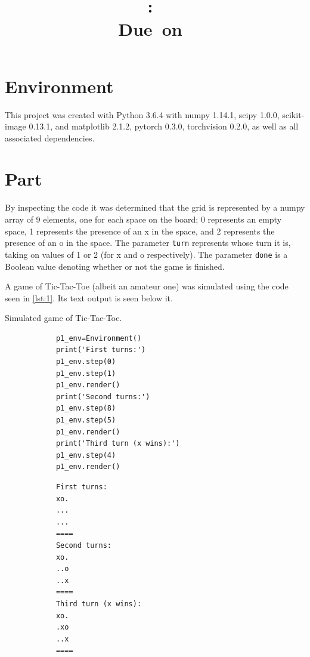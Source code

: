 \documentclass{article}
\title{
	\vspace{2in}
	\textmd{\textbf{\hmwkClass:\ \hmwkTitle}}\\
	\normalsize\vspace{0.1in}\small{Due\ on\ \hmwkDueDate}\\
	\vspace{0.1in}
	\vspace{3in}
}
\author{\textbf{\hmwkAuthorName}}
\newcommand{\enterproblemHeader}[1]{
}
\newcommand{\exitproblemHeader}[1]{
}
\newcounter{problem} %
\newcommand{\problemName}{}
\newenvironment{problem}[1][Part \theproblem]{ %
	\stepcounter{problem} %
	\renewcommand{\problemName}{#1} %
	\section{\problemName} %
	\enterproblemHeader{\problemName} %
}{
	\exitproblemHeader{\problemName} %
}
\begin{document}
\maketitle
\clearpage


\begin{problem}[Environment]	
	This project was created with Python 3.6.4 with numpy 1.14.1, scipy 1.0.0, scikit-image 0.13.1, and matplotlib 2.1.2, pytorch 0.3.0, torchvision 0.2.0, as well as all associated dependencies.
\end{problem}
\clearpage

\FloatBarrier
\begin{problem}
	By inspecting the code it was determined that the grid is represented by a numpy array of 9 elements, one for each space on the board; 0 represents an empty space, 1 represents the presence of an x in the space, and 2 represents the presence of an o in the space. The parameter \texttt{turn} represents whose turn it is, taking on values of 1 or 2 (for x and o respectively). The parameter \texttt{done} is a Boolean value denoting whether or not the game is finished.
	
	A game of Tic-Tac-Toe (albeit an amateur one) was simulated using the code seen in \cref{lst:1}. Its text output is seen below it.
	\begin{listing}
		\caption{Simulated game of Tic-Tac-Toe.}
		\label{lst:1}
		\begin{verbatim}
			p1_env=Environment()
			print('First turns:')
			p1_env.step(0)
			p1_env.step(1)
			p1_env.render()
			print('Second turns:')
			p1_env.step(8)
			p1_env.step(5)
			p1_env.render()
			print('Third turn (x wins):')
			p1_env.step(4)
			p1_env.render()
		\end{verbatim}
		\begin{verbatim}
			First turns:
			xo.
			...
			...
			====
			Second turns:
			xo.
			..o
			..x
			====
			Third turn (x wins):
			xo.
			.xo
			..x
			====
		\end{verbatim}
	\end{listing}	
	
\end{problem}
\clearpage
\end{document}
